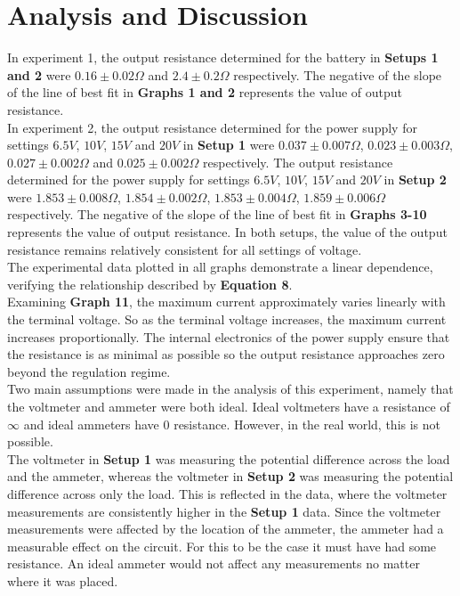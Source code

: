 \documentclass[
	letterpaper, %
	10pt, %
]{CSUniSchoolLabReport}
\begin{document}
\section{Analysis and Discussion}
In experiment 1, the output resistance determined for the battery in \textbf{Setups 1 and 2} were $ 0.16 \pm 0.02 \Omega $ and $ 2.4 \pm 0.2 \Omega $ respectively. The negative of the slope of the line of best fit in \textbf{Graphs 1 and 2} represents the value of output resistance.\\

In experiment 2, the output resistance determined for the power supply for settings $6.5V$, $10V$, $15V$ and $20V$ in \textbf{Setup 1} were $ 0.037 \pm 0.007 \Omega $, $ 0.023 \pm 0.003 \Omega $, $ 0.027 \pm 0.002 \Omega $ and $ 0.025 \pm 0.002 \Omega $ respectively. The output resistance determined for the power supply for settings $6.5V$, $10V$, $15V$ and $20V$ in \textbf{Setup 2} were $ 1.853 \pm 0.008 \Omega $, $ 1.854 \pm 0.002 \Omega $, $ 1.853 \pm 0.004 \Omega $, $ 1.859 \pm 0.006 \Omega $ respectively. The negative of the slope of the line of best fit in \textbf{Graphs 3-10} represents the value of output resistance. In both setups, the value of the output resistance remains relatively consistent for all settings of voltage.\\

The experimental data plotted in all graphs demonstrate a linear dependence, verifying the relationship described by \textbf{Equation 8}.\\

Examining \textbf{Graph 11}, the maximum current approximately varies linearly with the terminal voltage. So as the terminal voltage increases, the maximum current increases proportionally. The internal electronics of the power supply ensure that the resistance is as minimal as possible so the output resistance approaches zero beyond the regulation regime.\\

Two main assumptions were made in the analysis of this experiment, namely that the voltmeter and
ammeter were both ideal. Ideal voltmeters have a resistance of $\infty$ and ideal ammeters have $0$ resistance. However,
in the real world, this is not possible.\\

The voltmeter in \textbf{Setup 1} was measuring the potential difference across the load and the ammeter,
whereas the voltmeter in \textbf{Setup 2} was measuring the potential difference across only the load. This
is reflected in the data, where the voltmeter measurements are consistently higher in the \textbf{Setup 1}
data. Since the voltmeter measurements were affected by the location of the ammeter, the ammeter had
a measurable effect on the circuit. For this to be the case it must have had some resistance. An ideal ammeter
would not affect any measurements no matter where it was placed. \\
\end{document}
